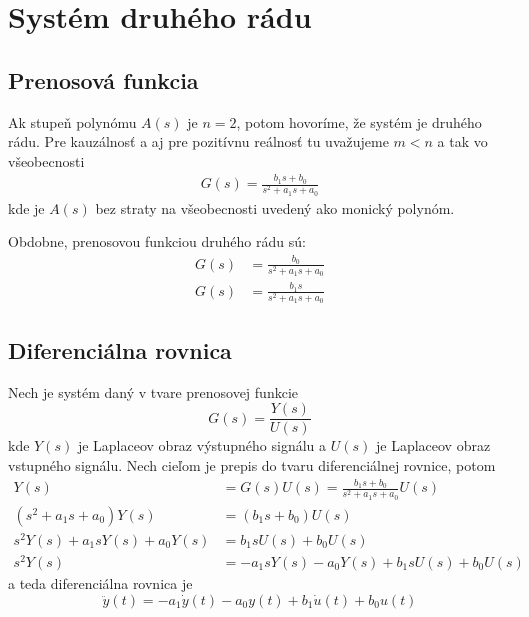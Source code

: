 \documentclass[a4paper, 10pt, ]{article}
\begin{document}
\section{Systém druhého rádu}


\subsection{Prenosová funkcia}

Ak stupeň polynómu $A(s)$ je $n = 2$, potom hovoríme, že systém je druhého rádu. Pre kauzálnosť a aj pre pozitívnu reálnosť tu uvažujeme $m<n$ a tak vo všeobecnosti
\begin{align} \label{typ2radtf}
    G(s) = \frac{b_1 s + b_0}{s^2 + a_1 s + a_0}
\end{align}
kde je $A(s)$ bez straty na všeobecnosti uvedený ako monický polynóm.

Obdobne, prenosovou funkciou druhého rádu sú:
\begin{subequations}
    \begin{align}
        G(s) &= \frac{b_0}{s^2 + a_1 s + a_0} \\
        G(s) &= \frac{b_1 s}{s^2 + a_1 s + a_0}
    \end{align}
\end{subequations}



\subsection{Diferenciálna rovnica}

Nech je systém daný v tvare prenosovej funkcie
\begin{equation}
    G(s) = \frac{Y(s)}{U(s)}
\end{equation}
kde $Y(s)$ je Laplaceov obraz výstupného signálu a $U(s)$ je Laplaceov obraz vstupného signálu. Nech cieľom je prepis do tvaru diferenciálnej rovnice, potom
\begin{subequations}
    \begin{align}
        Y(s) &= G(s) U(s) = \frac{b_1 s + b_0}{s^2 + a_1 s + a_0} U(s) \\
        (s^2 + a_1 s + a_0) Y(s) &= (b_1 s + b_0) U(s) \\
        s^2 Y(s) + a_1 s Y(s) + a_0 Y(s) &= b_1 s U(s) + b_0 U(s) \\
        s^2 Y(s) &= - a_1 s Y(s) - a_0 Y(s) + b_1 s U(s) + b_0 U(s) 
    \end{align}
\end{subequations}
a teda diferenciálna rovnica je
\begin{equation} \label{difrovnica2rad}
    \ddot y(t)  =  - a_1 \dot y(t) - a_0 y(t) + b_1 \dot u(t) + b_0 u(t)
\end{equation}
\end{document}
